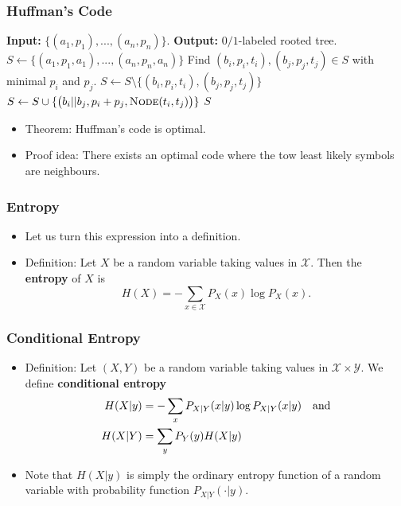 \documentclass[a4paper]{scrartcl}
\begin{document}
\subsubsection*{Huffman's Code}

\begin{algorithmic}[1]
\State \textbf{Input:} $\{(a_1,p_1),...,(a_n,p_n)\}$.
\State \textbf{Output:} $0/1$-labeled rooted tree.
\State $S\gets \{(a_1,p_1,a_1), ...,(a_n,p_n,a_n)\}$
\State Find $(b_i,p_i,t_i),(b_j,p_j,t_j) \in S$ with minimal $p_i$ and $p_j$.
\State $S\gets S \setminus \{(b_i,p_i,t_i),(b_j,p_j,t_j)\}$
\State $S\gets S \cup \{\big(b_i || b_j, p_i + p_j, \Call{Node}{t_i,t_j}\big)\}$
\EndWhile
\State \Return $S$
\EndProcedure
\end{algorithmic}

\begin{itemize}
\item Theorem: Huffman's code is optimal.
\item Proof idea: There exists an optimal code where the tow least likely symbols are neighbours.
\end{itemize}

\subsubsection*{Entropy}

\begin{itemize}
\item Let us turn this expression into a definition.
\item Definition: Let $X$ be a random variable taking values in $\mathcal{X}$. Then the \textbf{entropy} of $X$ is $$H(X) = - \sum_{x\in\mathcal{X}} P_X(x)\log P_X(x).$$
\end{itemize}

\subsubsection*{Conditional Entropy}

\begin{itemize}
\item Definition: Let $(X,Y)$ be a random variable taking values in $\mathcal{X} \times \mathcal{Y}$. We define \textbf{conditional entropy}
\begin{align*}
H(X|y) &= - \sum_x P_{X|Y}(x|y)\log P_{X|Y}(x|y) \text{\quad and}\\
H(X|Y) &= \sum_y P_Y(y)H(X|y)
\end{align*}
\item Note that $H(X|y)$ is simply the ordinary entropy function of a random variable with probability function $P_{X|Y}(\cdot|y)$.
\end{itemize}
\end{document}
